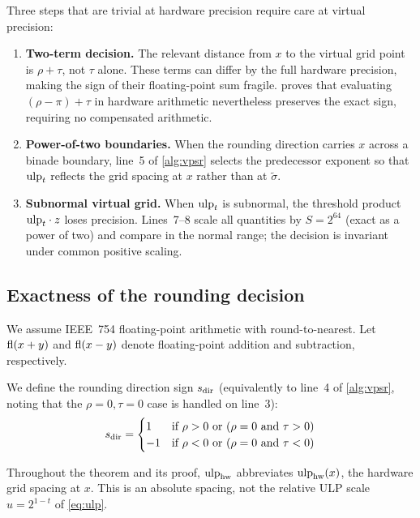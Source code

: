 Three steps that are trivial at hardware precision require care at virtual precision:
\begin{enumerate}[leftmargin=1.5em]
  \item \textbf{Two-term decision.} The relevant distance from $x$ to the virtual grid point is $\rho + \tau$, not $\tau$ alone. These terms can differ by the full hardware precision, making the sign of their floating-point sum fragile.  proves that evaluating $(\rho - \pi) + \tau$ in hardware arithmetic nevertheless preserves the exact sign, requiring no compensated arithmetic.
  \item \textbf{Power-of-two boundaries.} When the rounding direction carries $x$ across a binade boundary, line~5 of \cref{alg:vpsr} selects the predecessor exponent so that $\mathrm{ulp}_t$ reflects the grid spacing at $x$ rather than at $\tilde{\sigma}$.
  \item \textbf{Subnormal virtual grid.} When $\mathrm{ulp}_t$ is subnormal, the threshold product $\mathrm{ulp}_t \cdot z$ loses precision. Lines~7--8 scale all quantities by $S = 2^{64}$ (exact as a power of two) and compare in the normal range; the decision is invariant under common positive scaling.
\end{enumerate}

\subsection{Exactness of the rounding decision}
\label{sec:proof}

We assume IEEE~754 floating-point arithmetic with round-to-nearest. Let
$\mathrm{fl}(x+y)$ and $\mathrm{fl}(x-y)$ denote floating-point addition and subtraction,
respectively.

We define the rounding direction sign $s_{\rm dir}$ (equivalently to line~4 of \cref{alg:vpsr}, noting that the $\rho = 0, \tau = 0$ case is handled on line~3):
\[
s_{\rm dir} = 
\begin{cases} 
1 & \text{if } \rho > 0 \text{ or } (\rho = 0 \text{ and } \tau > 0) \\
-1 & \text{if } \rho < 0 \text{ or } (\rho = 0 \text{ and } \tau < 0)
\end{cases}
\]


Throughout the theorem and its proof, $\mathrm{ulp}_{\rm hw}$ abbreviates
$\mathrm{ulp}_{\rm hw}(x)$, the hardware grid spacing at $x$. This is an absolute
spacing, not the relative ULP scale $u = 2^{1-t}$ of \cref{eq:ulp}.


